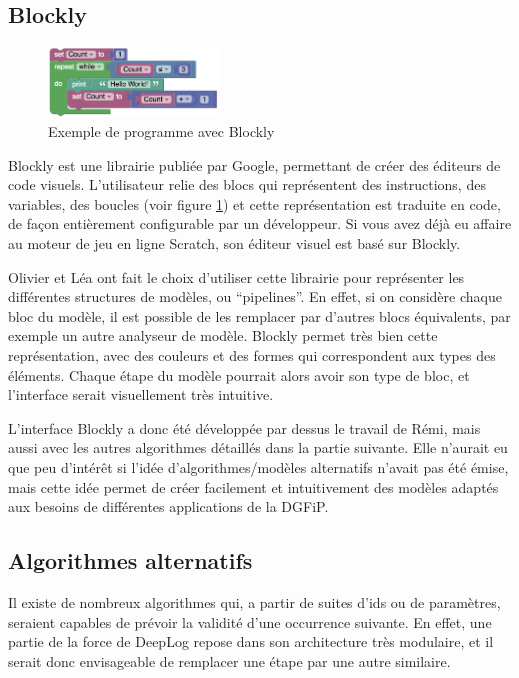 \documentclass[openany, 12pt]{memoir}
\begin{document}
\subsection{Blockly}

\begin{figure}[ht]
	\centering
	\includegraphics[width=0.4\textwidth]{images/blockly.png}
	\caption{Exemple de programme avec Blockly}
	\label{blockly}
\end{figure}

Blockly est une librairie publiée par Google, permettant de créer des éditeurs de code visuels. L'utilisateur relie des blocs qui représentent des instructions, des variables, des boucles (voir figure \ref{blockly}) et cette représentation est traduite en code, de façon entièrement configurable par un développeur. Si vous avez déjà eu affaire au moteur de jeu en ligne Scratch, son éditeur visuel est basé sur Blockly.

\bigskip
Olivier et Léa ont fait le choix d'utiliser cette librairie pour représenter les différentes structures de modèles, ou ``pipelines''. En effet, si on considère chaque bloc du modèle, il est possible de les remplacer par d'autres blocs équivalents, par exemple un autre analyseur de modèle. Blockly permet très bien cette représentation, avec des couleurs et des formes qui correspondent aux types des éléments. Chaque étape du modèle pourrait alors avoir son type de bloc, et l'interface serait visuellement très intuitive.

L'interface Blockly a donc été développée par dessus le travail de Rémi, mais aussi avec les autres algorithmes détaillés dans la partie suivante. Elle n'aurait eu que peu d'intérêt si l'idée d'algorithmes/modèles alternatifs n'avait pas été émise, mais cette idée permet de créer facilement et intuitivement des modèles adaptés aux besoins de différentes applications de la DGFiP.

\subsection{Algorithmes alternatifs}

Il existe de nombreux algorithmes qui, a partir de suites d'ids ou de paramètres, seraient capables de prévoir la validité d'une occurrence suivante. En effet, une partie de la force de DeepLog repose dans son architecture très modulaire, et il serait donc envisageable de remplacer une étape par une autre similaire.
\end{document}

